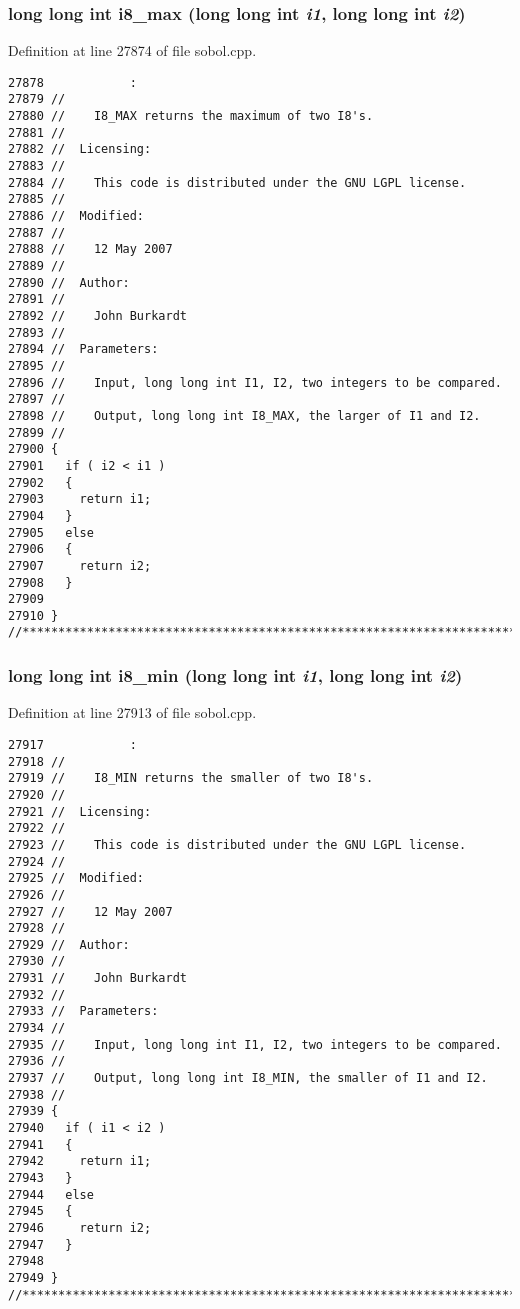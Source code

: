\subsubsection{\setlength{\rightskip}{0pt plus 5cm}long long int i8\_\-max (long long int {\em i1}, long long int {\em i2})}\label{test_2sobol_8H_b74fd7151bdaca24b5e38cacad5b250a}




Definition at line 27874 of file sobol.cpp.

\begin{Code}\begin{verbatim}27878            :
27879 //
27880 //    I8_MAX returns the maximum of two I8's.
27881 //
27882 //  Licensing:
27883 //
27884 //    This code is distributed under the GNU LGPL license. 
27885 //
27886 //  Modified:
27887 //
27888 //    12 May 2007
27889 //
27890 //  Author:
27891 //
27892 //    John Burkardt
27893 //
27894 //  Parameters:
27895 //
27896 //    Input, long long int I1, I2, two integers to be compared.
27897 //
27898 //    Output, long long int I8_MAX, the larger of I1 and I2.
27899 //
27900 {
27901   if ( i2 < i1 ) 
27902   {
27903     return i1;
27904   }
27905   else 
27906   {
27907     return i2;
27908   }
27909 
27910 }
//****************************************************************************80
\end{verbatim}
\end{Code}


\subsubsection{\setlength{\rightskip}{0pt plus 5cm}long long int i8\_\-min (long long int {\em i1}, long long int {\em i2})}\label{test_2sobol_8H_b36e8d4b0bc7da5afae73987d8649e06}




Definition at line 27913 of file sobol.cpp.

\begin{Code}\begin{verbatim}27917            :
27918 //
27919 //    I8_MIN returns the smaller of two I8's.
27920 //
27921 //  Licensing:
27922 //
27923 //    This code is distributed under the GNU LGPL license. 
27924 //
27925 //  Modified:
27926 //
27927 //    12 May 2007
27928 //
27929 //  Author:
27930 //
27931 //    John Burkardt
27932 //
27933 //  Parameters:
27934 //
27935 //    Input, long long int I1, I2, two integers to be compared.
27936 //
27937 //    Output, long long int I8_MIN, the smaller of I1 and I2.
27938 //
27939 {
27940   if ( i1 < i2 ) 
27941   {
27942     return i1;
27943   }
27944   else 
27945   {
27946     return i2;
27947   }
27948 
27949 }
//****************************************************************************80
\end{verbatim}
\end{Code}


